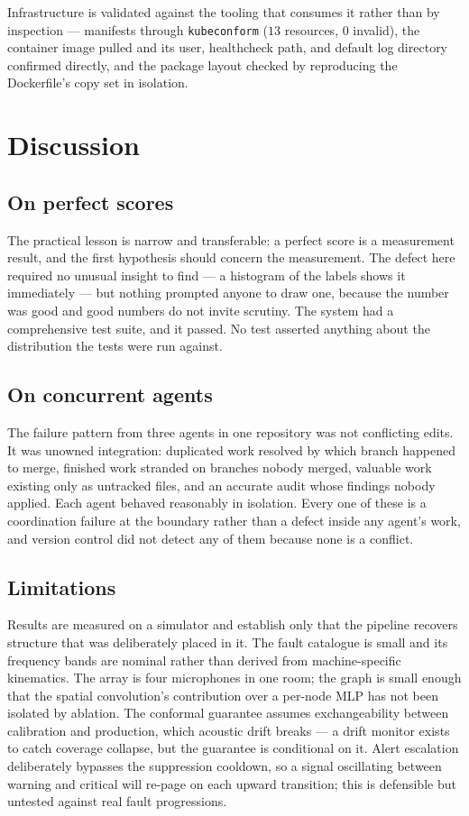 \documentclass[11pt]{article}
\let\oldsection\section
\renewcommand{\section}{\clearpage\oldsection}
\begin{document}
Infrastructure is validated against the tooling that consumes it rather than by
inspection --- manifests through \texttt{kubeconform} ($13$ resources, $0$
invalid), the container image pulled and its user, healthcheck path, and default
log directory confirmed directly, and the package layout checked by reproducing
the Dockerfile's copy set in isolation.

\section{Discussion}

\subsection{On perfect scores}

The practical lesson is narrow and transferable: a perfect score is a
measurement result, and the first hypothesis should concern the measurement. The
defect here required no unusual insight to find --- a histogram of the labels
shows it immediately --- but nothing prompted anyone to draw one, because the
number was good and good numbers do not invite scrutiny. The system had a
comprehensive test suite, and it passed. No test asserted anything about the
distribution the tests were run against.

\subsection{On concurrent agents}

The failure pattern from three agents in one repository was not conflicting
edits. It was unowned integration: duplicated work resolved by which branch
happened to merge, finished work stranded on branches nobody merged, valuable
work existing only as untracked files, and an accurate audit whose findings
nobody applied. Each agent behaved reasonably in isolation. Every one of these
is a coordination failure at the boundary rather than a defect inside any
agent's work, and version control did not detect any of them because none is a
conflict.

\subsection{Limitations}

Results are measured on a simulator and establish only that the pipeline
recovers structure that was deliberately placed in it. The fault catalogue is
small and its frequency bands are nominal rather than derived from
machine-specific kinematics. The array is four microphones in one room; the
graph is small enough that the spatial convolution's contribution over a
per-node MLP has not been isolated by ablation. The conformal guarantee assumes
exchangeability between calibration and production, which acoustic drift breaks
--- a drift monitor exists to catch coverage collapse, but the guarantee is
conditional on it. Alert escalation deliberately bypasses the suppression
cooldown, so a signal oscillating between warning and critical will re-page on
each upward transition; this is defensible but untested against real fault
progressions.
\end{document}
